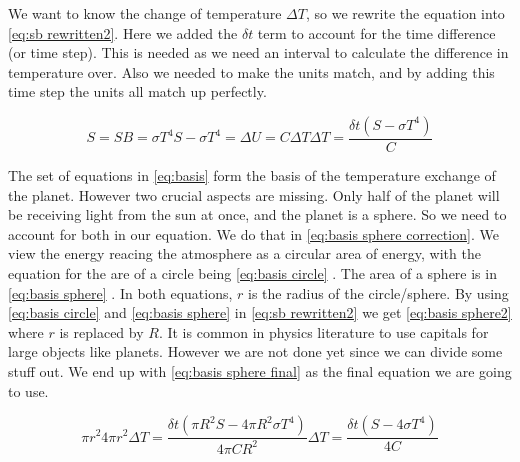 We want to know the change of temperature $\Delta T$, so we rewrite the equation into \autoref{eq:sb rewritten2}. Here we added the $\delta t$ term to account for the time difference (or time step). This is needed as
we need an interval to calculate the difference in temperature over. Also we needed to make the units match, and by adding this time step the units all match up perfectly.

\begin{subequations}
    \begin{equation}
        S = SB = \sigma T^4
        \label{eq:stefan-boltzmann}
    \end{equation}
    \begin{equation}
        S - \sigma T^4 = \Delta U = C \Delta T
        \label{eq:sb rewritten}
    \end{equation}
    \begin{equation}
        \Delta T = \frac{\delta t(S - \sigma T^4)}{C}
        \label{eq:sb rewritten2}
    \end{equation}
    \label{eq:basis}
\end{subequations}

The set of equations in \autoref{eq:basis} form the basis of the temperature exchange of the planet. However two crucial aspects are missing. Only half of the planet will be receiving light from 
the sun at once, and the planet is a sphere. So we need to account for both in our equation. We do that in \autoref{eq:basis sphere correction}. We view the energy reacing the atmosphere as a 
circular area of energy, with the equation for the are of a circle being \autoref{eq:basis circle} \cite{areaCircle}. The area of a sphere is in \autoref{eq:basis sphere} \cite{areaSphere}. In 
both equations, $r$ is the radius of the circle/sphere. By using \autoref{eq:basis circle} and \autoref{eq:basis sphere} in \autoref{eq:sb rewritten2} we get \autoref{eq:basis sphere2} where 
$r$ is replaced by $R$. It is common in physics literature to use capitals for large objects like planets. However we are not done yet since we can divide some stuff out. We end up with 
\autoref{eq:basis sphere final} as the final equation we are going to use.

\begin{subequations}
    \begin{equation}
        \pi r^2
        \label{eq:basis circle}
    \end{equation}
    \begin{equation}
        4 \pi r^2
        \label{eq:basis sphere}
    \end{equation}
    \begin{equation}
        \Delta T = \frac{\delta t (\pi R^2S - 4\pi R^2\sigma T^4)}{4\pi CR^2}
        \label{eq:basis sphere2}
    \end{equation}
    \begin{equation}
        \Delta T = \frac{\delta t (S - 4\sigma T^4)}{4C}
        \label{eq:basis sphere final}
    \end{equation}
    \label{eq:basis sphere correction}
\end{subequations}

